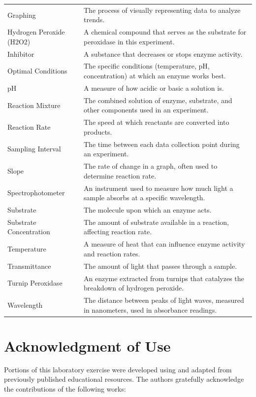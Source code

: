 \documentclass[
  letterpaper,
  DIV=11,
  numbers=noendperiod]{scrreprt}
\begin{document}
{\begin{longtable}[]{@{}
  >{\raggedright\arraybackslash}p{}
  >{\raggedright\arraybackslash}p{}@{}}
Graphing & The process of visually representing data to analyze
trends. \\
Hydrogen Peroxide (H2O2) & A chemical compound that serves as the
substrate for peroxidase in this experiment. \\
Inhibitor & A substance that decreases or stops enzyme activity. \\
Optimal Conditions & The specific conditions (temperature, pH,
concentration) at which an enzyme works best. \\
pH & A measure of how acidic or basic a solution is. \\
Reaction Mixture & The combined solution of enzyme, substrate, and other
components used in an experiment. \\
Reaction Rate & The speed at which reactants are converted into
products. \\
Sampling Interval & The time between each data collection point during
an experiment. \\
Slope & The rate of change in a graph, often used to determine reaction
rate. \\
Spectrophotometer & An instrument used to measure how much light a
sample absorbs at a specific wavelength. \\
Substrate & The molecule upon which an enzyme acts. \\
Substrate Concentration & The amount of substrate available in a
reaction, affecting reaction rate. \\
Temperature & A measure of heat that can influence enzyme activity and
reaction rates. \\
Transmittance & The amount of light that passes through a sample. \\
Turnip Peroxidase & An enzyme extracted from turnips that catalyzes the
breakdown of hydrogen peroxide. \\
Wavelength & The distance between peaks of light waves, measured in
nanometers, used in absorbance readings. \\
\end{longtable}
}

\section{\texorpdfstring{\textbf{Acknowledgment of
Use}}{Acknowledgment of Use}}\label{acknowledgment-of-use}

Portions of this laboratory exercise were developed using and adapted
from previously published educational resources. The authors gratefully
acknowledge the contributions of the following works:
\end{document}
